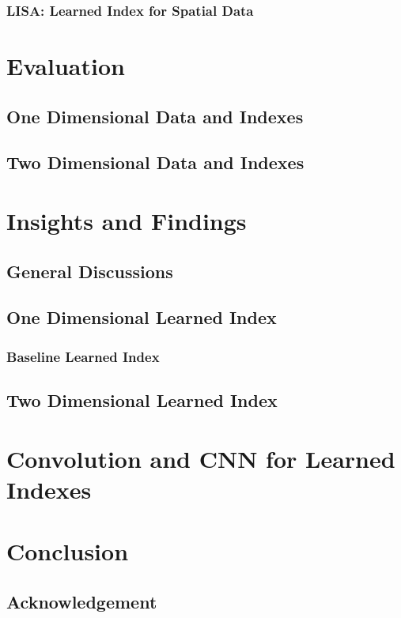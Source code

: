 \documentclass[a4paper,12pt]{scrreprt}
\begin{document}


\subsection{LISA: Learned Index for Spatial Data}



\chapter{Evaluation}



\section{One Dimensional Data and Indexes}



\section{Two Dimensional Data and Indexes}



\chapter{Insights and Findings}

\section{General Discussions}



\section{One Dimensional Learned Index}

\subsection{Baseline Learned Index}



\section{Two Dimensional Learned Index}



\chapter{Convolution and CNN for Learned Indexes}



\chapter{Conclusion}

\section*{Acknowledgement}





\end{document}
